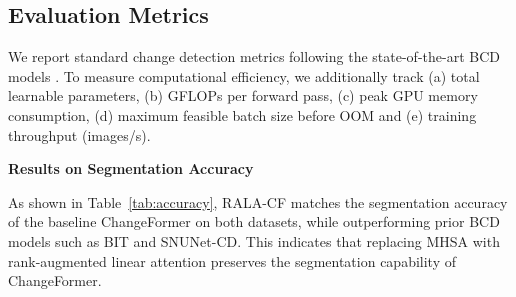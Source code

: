 \subsection{Evaluation Metrics}

We report standard change detection metrics following the state-of-the-art BCD models \cite{Zheng2020LEVIR, Shen2021DSIFN, Bandara2022ChangeFormer, Chen2022BIT, Fang2021SNUNetCD}. To measure computational efficiency, we additionally track (a) total learnable parameters, (b) GFLOPs per forward pass, (c) peak GPU memory consumption, (d) maximum feasible batch size before OOM and (e) training throughput (images/s).

\noindent \textbf{Results on Segmentation Accuracy}

\begin{table}[h!]
\caption{Segmentation accuracy of baseline BCD models and our variants on LEVIR-CD and DSIFN-CD using $256\times256$ input patches and batch size 16. 
Metrics for SNUNet-CD and BIT are taken from the original ChangeFormer paper \cite{Bandara2022ChangeFormer}.}
\label{tab:accuracy}
\centering
{}
\end{table}

\noindent As shown in Table~\ref{tab:accuracy}, RALA-CF matches the segmentation accuracy of the baseline ChangeFormer on both datasets, while outperforming prior BCD models such as BIT and SNUNet-CD. This indicates that replacing MHSA with rank-augmented linear attention preserves the segmentation capability of ChangeFormer.

